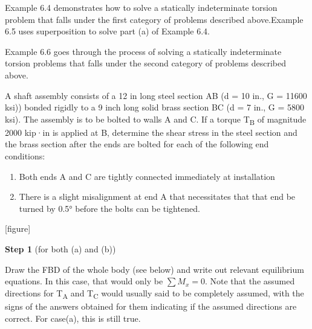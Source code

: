 \documentclass[
  letterpaper,
  DIV=11,
  numbers=noendperiod]{scrreprt}
\providecommand{\tightlist}{%
  \setlength{\itemsep}{0pt}\setlength{\parskip}{0pt}}\usepackage{longtable,booktabs,array}
\theoremstyle{definition}
\theoremstyle{remark}
\begin{document}
Example 6.4 demonstrates how to solve a statically indeterminate torsion
problem that falls under the first category of problems described
above.Example 6.5 uses superposition to solve part (a) of Example 6.4.

Example 6.6 goes through the process of solving a statically
indeterminate torsion problems that falls under the second category of
problems described above.

\begin{tcolorbox}[enhanced jigsaw, leftrule=.75mm, colbacktitle=quarto-callout-tip-color!10!white, breakable, opacityback=0, colback=white, titlerule=0mm, toprule=.15mm, colframe=quarto-callout-tip-color-frame, coltitle=black, title={Example 6.4}, toptitle=1mm, bottomrule=.15mm, rightrule=.15mm, left=2mm, arc=.35mm, opacitybacktitle=0.6, bottomtitle=1mm]

A shaft assembly consists of a 12 in long steel section AB (d = 10 in.,
G = 11600 ksi)) bonded rigidly to a 9 inch long solid brass section BC
(d = 7 in., G = 5800 ksi). The assembly is to be bolted to walls A and
C. If a torque T\textsubscript{B} of magnitude 2000 kip·in is applied at
B, determine the shear stress in the steel section and the brass section
after the ends are bolted for each of the following end conditions:

\begin{enumerate}
\def\labelenumi{\arabic{enumi}.}
\tightlist
\item
  Both ends A and C are tightly connected immediately at installation
\item
  There is a slight misalignment at end A that necessitates that that
  end be turned by 0.5° before the bolts can be tightened.
\end{enumerate}

{[}figure{]}

\begin{tcolorbox}[enhanced jigsaw, leftrule=.75mm, colbacktitle=quarto-callout-tip-color!10!white, breakable, opacityback=0, colback=white, titlerule=0mm, toprule=.15mm, colframe=quarto-callout-tip-color-frame, coltitle=black, title={Solution}, toptitle=1mm, bottomrule=.15mm, rightrule=.15mm, left=2mm, arc=.35mm, opacitybacktitle=0.6, bottomtitle=1mm]

\textbf{Step 1} (for both (a) and (b))

Draw the FBD of the whole body (see below) and write out relevant
equilibrium equations. In this case, that would only be \(\sum M_x=0\).
Note that the assumed directions for T\textsubscript{A} and
T\textsubscript{C} would usually said to be completely assumed, with the
signs of the answers obtained for them indicating if the assumed
directions are correct. For case(a), this is still true.


\end{tcolorbox}
\end{tcolorbox}
\end{document}
